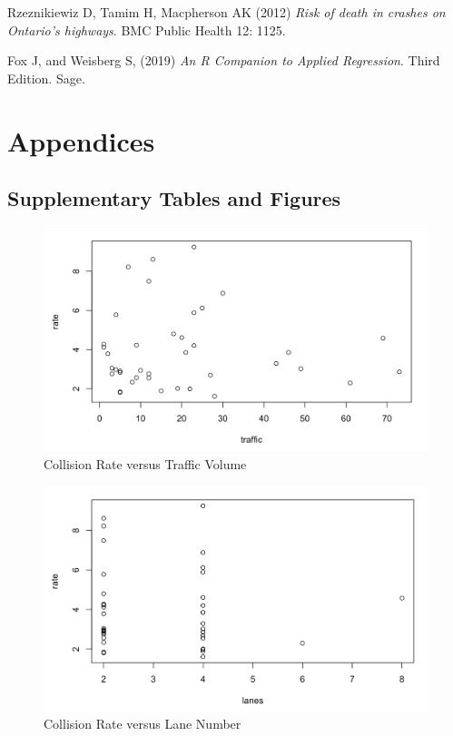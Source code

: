 \documentclass[12pt]{report}
\begin{document}
\begin{thebibliography}{9}
Rzeznikiewiz D, Tamim H, Macpherson AK (2012) 
\textit{Risk of death in crashes on Ontario’s highways}.
BMC Public Health 12: 1125.

Fox J, and Weisberg S, (2019) 
\textit{An R Companion to Applied Regression}. 
Third Edition. Sage.

\end{thebibliography}

\chapter{Appendices}
\section{Supplementary Tables and Figures}
\begin{figure}[H]
    \centering
    \includegraphics[width=1\textwidth]{Preliminary graphs/ST562 Rate vs Traffic.png}
    \caption{Collision Rate versus Traffic Volume} \label{fig:PG1}
\end{figure}
\noindent

\begin{figure}[H]
    \centering
    \includegraphics[width=1\textwidth]{Preliminary graphs/ST562 rate vs lanes.png}
    \caption{Collision Rate versus Lane Number} \label{fig:PG2}
\end{figure}
\noindent
\end{document}

